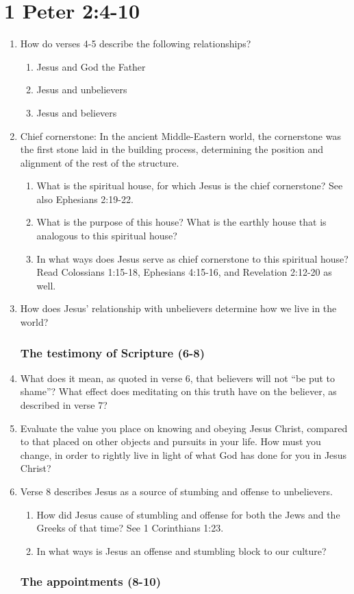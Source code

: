 \documentclass[12pt]{article}
\begin{document}
\part*{1 Peter 2:4-10}
\begin{enumerate}
\section*{The analogy (4-5)}
\item How do verses 4-5 describe the following relationships?
    \begin{enumerate}
    \item Jesus and God the Father
    \item Jesus and unbelievers
    \item Jesus and believers
    \end{enumerate}
\item Chief cornerstone: In the ancient Middle-Eastern world,
    the cornerstone was the first stone laid in the building process,
    determining the position and alignment of the rest of the structure.
    \begin{enumerate}
    \item What is the spiritual house, for which Jesus is the chief cornerstone?
        See also Ephesians 2:19-22.
    \item What is the purpose of this house?
        What is the earthly house that is analogous to this spiritual house?
    \item In what ways does Jesus serve as chief cornerstone 
        to this spiritual house?
        Read Colossians 1:15-18, Ephesians 4:15-16, and Revelation 2:12-20
        as well.
    \end{enumerate}
\item How does Jesus' relationship with unbelievers determine
    how we live in the world?
\section*{The testimony of Scripture (6-8)}
\item What does it mean, as quoted in verse 6, that 
        believers will not ``be put to shame''?
    What effect does meditating on this truth have on the believer,
        as described in verse 7?
\item Evaluate the value you place on knowing and obeying Jesus Christ,
        compared to that placed on other objects and pursuits in your life.
    How must you change, in order to rightly live
        in light of what God has done for you in Jesus Christ?
\item Verse 8 describes Jesus as a source of stumbing and offense
    to unbelievers.
    \begin{enumerate}
    \item How did Jesus cause of stumbling and offense 
            for both the Jews and the Greeks of that time?
        See 1 Corinthians 1:23.
    \item In what ways is Jesus an offense and stumbling block to our culture?
    \end{enumerate}
\section*{The appointments (8-10)}
\end{enumerate}
\end{document}
